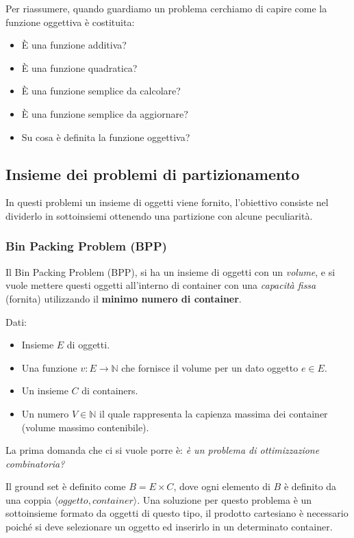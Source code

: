 \documentclass{article}
\begin{document}
Per riassumere, quando guardiamo un problema cerchiamo di capire come la funzione oggettiva è costituita:
\begin{itemize}
    \item È una funzione additiva?
    \item È una funzione quadratica?
    \item È una funzione semplice da calcolare?
    \item È una funzione semplice da aggiornare?
    \item Su cosa è definita la funzione oggettiva?
\end{itemize}

\subsection{Insieme dei problemi di partizionamento}
In questi problemi un insieme di oggetti viene fornito, l'obiettivo consiste nel dividerlo in sottoinsiemi ottenendo una partizione con alcune peculiarità.
\subsubsection{Bin Packing Problem (BPP)}
Il Bin Packing Problem (BPP), si ha un insieme di oggetti con un \textit{volume}, e si vuole mettere questi oggetti all'interno di
container con una \textit{capacità fissa} (fornita) utilizzando il \textbf{minimo numero di container}.

Dati:
\begin{itemize}
    \item Insieme $E$ di oggetti.
    \item Una funzione $v:E \rightarrow \mathbb{N}$ che fornisce il volume per un dato oggetto $e\in E$.
    \item Un insieme $C$ di containers.
    \item Un numero $V\in \mathbb{N}$ il quale rappresenta la capienza massima dei container (volume massimo contenibile).
\end{itemize}

La prima domanda che ci si vuole porre è: \textit{è un problema di ottimizzazione combinatoria?}

Il ground set è definito come $B=E\times C$, dove ogni elemento di $B$ è definito da una coppia $\langle oggetto, container\rangle$. Una soluzione
per questo problema è un sottoinsieme formato da oggetti di questo tipo, il prodotto cartesiano è necessario poiché si deve selezionare un oggetto ed inserirlo in un determinato container.
\end{document}
